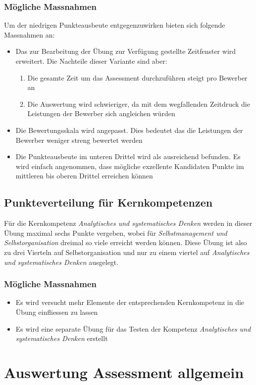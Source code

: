\subsubsection{Mögliche Massnahmen}
Um der niedrigen Punkteausbeute entgegenzuwirken bieten sich folgende Massnahmen an:
\begin{itemize}
\item Das zur Bearbeitung der Übung zur Verfügung gestellte Zeitfenster wird erweitert. Die Nachteile dieser Variante sind aber:
\begin{enumerate}
\item Die gesamte Zeit um das Assessment durchzuführen steigt pro Bewerber an
\item Die Auswertung wird schwieriger, da mit dem wegfallenden Zeitdruck die Leistungen der Bewerber sich angleichen würden
\end{enumerate}
\item Die Bewertungsskala wird angepasst. Dies bedeutet das die Leistungen der Bewerber weniger streng bewertet werden
\item Die Punkteausbeute im unteren Drittel wird als ausreichend befunden. Es wird einfach angenommen, dass mögliche exzellente Kandidaten Punkte im mittleren bis oberen Drittel erreichen können
\end{itemize} 
\subsection{Punkteverteilung für Kernkompetenzen}
Für die Kernkompetenz \textit{Analytisches und systematisches Denken} werden in dieser Übung maximal sechs Punkte vergeben, wobei für \textit{Selbstmanagement und Selbstorganisation} dreimal so viele erreicht werden können. Diese Übung ist also zu drei Vierteln auf Selbstorganisation und nur zu einem viertel auf \textit{Analytisches und systematisches Denken} ausgelegt.
\subsubsection{Mögliche Massnahmen}
\begin{itemize}
\item Es wird versucht mehr Elemente der entsprechenden Kernkompetenz in die Übung einfliessen zu lassen
\item Es wird eine separate Übung für das Testen der Kompetenz \textit{Analytisches und systematisches Denken} erstellt
\end{itemize}


\section{Auswertung Assessment allgemein}
